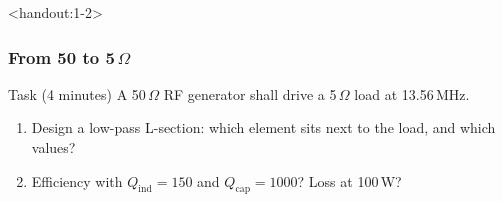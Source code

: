 \begin{frame}<handout:1-2>
	\frametitle{From 50 to 5\,$\Omega$}
	\begin{block}{Task (4 minutes)}
		A 50\,$\Omega$ RF generator shall drive a 5\,$\Omega$ load at 13.56\,MHz.
		\begin{enumerate}
			\item Design a low-pass L-section: which element sits next to the load, and which values?
			\item Efficiency with $Q_\mathrm{ind}=150$ and $Q_\mathrm{cap}=1000$? Loss at 100\,W?
		\end{enumerate}
	\end{block}
\end{frame}

